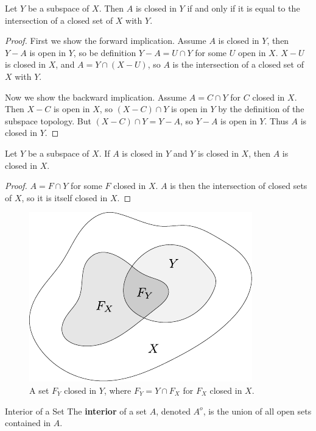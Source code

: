 \documentclass[10pt]{report}
\begin{document}
\begin{prop}
	\label{closed-isct}
Let $Y$ be a subspace of $X$. Then $A$ is closed in $Y$ if and only if it is equal to the intersection of a closed set of $X$ with $Y$.
\end{prop}
\begin{proof}
	First we show the forward implication. Assume $A$ is closed in $Y$, then $Y-A$ is open in $Y$, so be definition $Y-A=U \cap Y$ for some $U$ open in $X$. $X-U$ is closed in $X$, and $A = Y \cap (X-U)$, so $A$ is the intersection of a closed set of $X$ with $Y$.

	Now we show the backward implication. Assume $A = C \cap Y$ for $C$ closed in $X$. Then $X-C$ is open in $X$, so $(X-C) \cap Y$ is open in $Y$ by the definition of the subspace topology. But $(X-C) \cap Y = Y-A$, so $Y-A$ is open in $Y$. Thus $A$ is closed in $Y$.
\end{proof}

\begin{prop}
Let $Y$ be a subspace of $X$. If $A$ is closed in $Y$ and $Y$ is closed in $X$, then $A$ is closed in $X$.
\end{prop}
\begin{proof}
	$A = F \cap Y$ for some $F$ closed in $X$. $A$ is then the intersection of closed sets of $X$, so it is itself closed in $X$.
\end{proof}

\begin{figure}[H]
	\centering
	\includegraphics[scale=1]{fig/closed-isct.pdf}
	\caption{A set $F_Y$ closed in $Y$, where $F_Y = Y \cap F_X$ for $F_X$ closed in $X$.}
\end{figure}

\begin{defn}{Interior of a Set}{}
	The \textbf{interior} of a set $A$, denoted $A^o$, is the union of all open sets contained in $A$.
\end{defn}
\end{document}

